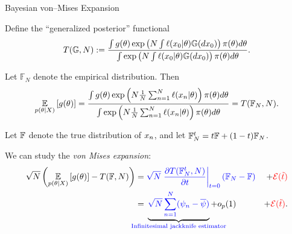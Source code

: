 \def\gdist{\mathbb{G}}
\def\fndist{\mathbb{F}_N}
\def\ftdist{\mathbb{F}_N^{\t}}
\def\fwdist{\mathbb{F}_{N}^{w}}
\def\T{T}   %
\def\Tlin{T_{\mathrm{lin}}} %
\def\t{t}   %
\def\g{g}   %
\def\xn{\x_{0}}   %
\def\prior{\pi}
\def\ttil{\tilde{\t}}   %



\begin{frame}[t]{Bayesian von--Mises Expansion}


\pause

Define the ``generalized posterior'' functional
%
\begin{align*}
    \T(\gdist, N) := \frac{
        \int \g(\theta) \exp\left( N \int \ell(\xn \vert \theta) \gdist(d\xn)\right)
            \prior(\theta) d\theta
    }
    {
    \int \exp\left( N \int \ell(\xn \vert \theta) \gdist(d\xn)\right)
        \prior(\theta) d\theta
    }.
\end{align*}
%
\pause

Let $\fndist$ denote the empirical distribution.  Then
%
\begin{align*}
    \expect{\post}{\g(\theta)} =
    \frac{
        \int \g(\theta) \exp\left( N \meann \ell(\x_n \vert \theta) \right)
            \prior(\theta) d\theta
    }
    {
    \int \exp\left( N \meann \ell(\x_n \vert \theta) \right)
        \prior(\theta) d\theta
    } = \T(\fndist, N).
\end{align*}
%
\pause

Let $\mathbb{F}$ denote the true distribution of $x_n$, and
let $\ftdist  = \t \fdist + (1 - \t) \fndist$. 

We can study the \textit{von Mises expansion}:
%
\begin{align*}
    \sqrt{N} \left(\expect{\post}{\g(\theta)} - \T(\fdist, N) \right) ={}&
        \blue{\sqrt{N} \fracat{\partial \T(\ftdist, N)}{\partial \t}{\t = 0} (\fndist - \fdist)}
        & + \red{\err(\ttil)}
\\={}&
\undernote{
    \blue{\sqrt{N} \sumn (\infl_n - \overline{\infl})} }
    {\textrm{\blue{Infinitesimal jackknife estimator}}} + o_p(1) 
    & + \red{\err(\ttil)}.
\end{align*}
%

\end{frame}

